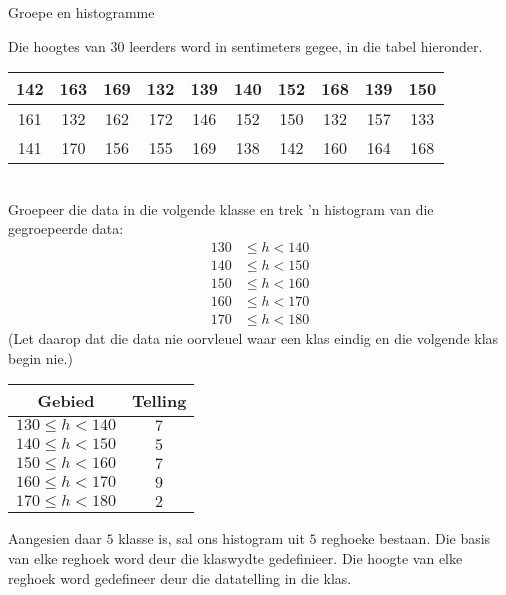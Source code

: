 \begin{wex}{Groepe en histogramme}
{Die hoogtes van $30$ leerders word in sentimeters gegee, in die tabel hieronder.
\\
    \begin{center}
      \begin{tabular}{|c|c|c|c|c|c|c|c|c|c|}\hline
   
        142 & 163 & 169 & 132 & 139 & 140 & 152 & 168 & 139 & 150\\ \hline
        161 & 132 & 162 & 172 & 146 & 152 & 150 & 132 & 157 & 133\\ \hline
        141 & 170 & 156 & 155 & 169 & 138 & 142 & 160 & 164 & 168\\\hline
 
      \end{tabular}
    \end{center}
\vspace {8pt}\\
    Groepeer die data in die volgende klasse en trek ’n histogram van die gegroepeerde data:
    \begin{align*}
      130 &\leq h < 140 \\
      140 &\leq h < 150 \\
      150 &\leq h < 160 \\
      160 &\leq h < 170 \\
      170 &\leq h < 180
    \end{align*}
    (Let daarop dat die data nie oorvleuel waar een klas eindig en die volgende klas begin nie.)
}{
  \begin{center}
    \begin{tabular}{|c|c|} \hline

      \textbf{Gebied} & \textbf{Telling} \\ \hline
    
      $130 \leq h < 140$ & $7$ \\ \hline
      $140 \leq h < 150$ & $5$ \\\hline
      $150 \leq h < 160$ & $7$ \\\hline
      $160 \leq h < 170$ & $9$ \\\hline
      $170 \leq h < 180$ & $2$ \\\hline

    \end{tabular}
  \end{center}
  

  Aangesien daar $5$ klasse is, sal ons histogram uit $5$ reghoeke bestaan. Die basis van elke reghoek word deur die klaswydte gedefinieer. Die hoogte van elke reghoek word gedefineer deur die datatelling in die klas.
  
}
\end{wex}

